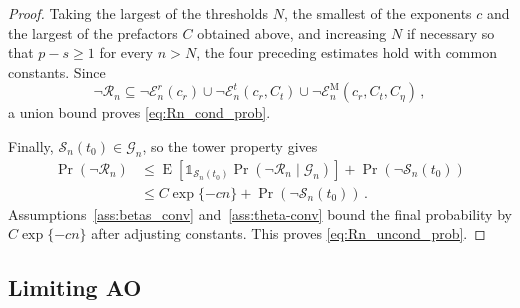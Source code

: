 \documentclass{article}
\DeclareMathOperator{\expect}{E}
\theoremstyle{definition}
\begin{document}
\begin{bibunit}
\begin{proof}
Taking the largest of the thresholds $N$, the smallest of the exponents $c$ and the largest of the prefactors $C$ obtained above, and increasing $N$ if necessary so that $p-s\geq1$ for every $n>N$, the four preceding estimates hold with common
constants. Since
$$
	\lnot\mathcal R_n
	\subseteq
	\lnot\mathcal E_n^r(c_r)
	\cup
	\lnot\mathcal E_n^t(c_r,C_t)
	\cup
	\lnot\mathcal E_n^{\mathrm M}(c_r,C_t,C_\eta)\,,
$$
a union bound proves \eqref{eq:Rn_cond_prob}.

Finally, $\mathcal S_n(t_0)\in\mathcal G_n$, so the tower property gives
$$
\begin{aligned}
	\Pr(\lnot\mathcal R_n)
	&\leq
	\expect\left[
		\mathds{1}_{\mathcal S_n(t_0)}
		\Pr(
			\lnot\mathcal R_n
			\mid
			\mathcal G_n
		)
	\right]
	+
	\Pr(\lnot\mathcal S_n(t_0))
	\\
	&\leq
	C\exp\{-cn\}
	+
	\Pr(\lnot\mathcal S_n(t_0))\,.
\end{aligned}
$$
Assumptions~\ref{ass:betas_conv} and~\ref{ass:theta-conv} bound the final
probability by $C\exp\{-cn\}$ after adjusting constants. This proves
\eqref{eq:Rn_uncond_prob}.
\end{proof}


\subsection{Limiting AO}
\label{sec:ao-limit}


\end{bibunit}
\end{document}

